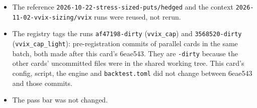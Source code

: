 \documentclass{article}
\begin{document}
\begin{itemize}

\item The reference \texttt{2026-\allowbreak{}10-\allowbreak{}22-\allowbreak{}stress-\allowbreak{}sized-\allowbreak{}puts/\allowbreak{}hedged} and the context \texttt{2026-\allowbreak{}11-\allowbreak{}02-\allowbreak{}vvix-\allowbreak{}sizing/\allowbreak{}vvix} runs were reused, not rerun.

\item The registry tags the runs \texttt{af47198-\allowbreak{}dirty} (\texttt{vvix\_\allowbreak{}cap}) and \texttt{3568520-\allowbreak{}dirty} (\texttt{vvix\_\allowbreak{}cap\_\allowbreak{}light}): pre-registration commits of parallel cards in the same batch, both made after this card's 6eae543. They are \texttt{-\allowbreak{}dirty} because the other cards' uncommitted files were in the shared working tree. This card's config, script, the engine and \texttt{backtest.\allowbreak{}toml} did not change between 6eae543 and those commits.

\item The pass bar was not changed.

\end{itemize}
\end{document}
